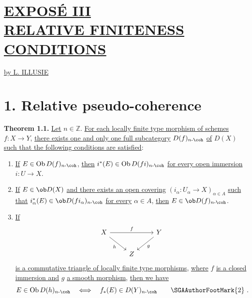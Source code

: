 \section*{\underline{EXPOSÉ III}\\[3pt] \underline{\underline{RELATIVE FINITENESS CONDITIONS}}}
\begin{center}
\underline{by L. ILLUSIE}
\end{center}

\section*{1. Relative pseudo-coherence}

\textbf{Theorem 1.1.} \uline{Let} \(n\in\mathbb Z\). \uline{For each locally finite type morphism of schemes} \(f:X\longrightarrow Y\), \uline{there exists one and only one full subcategory} \(D(f)_{n\text{-}\coh}\) \uline{of} \(D(X)\) \uline{such that the following conditions are satisfied}:
\begin{enumerate}[label=(\roman*)]
\item \uline{If} \(E\in\operatorname{Ob} D(f)_{n\text{-}\coh}\), \uline{then} \(i^*(E)\in\operatorname{Ob} D(fi)_{n\text{-}\coh}\) \uline{for every open immersion} \(i:U\to X\).

\item \uline{If} \(E\in\ob D(X)\) \uline{and there exists an open covering} \((i_\alpha:U_\alpha\to X)_{\alpha\in A}\) \uline{such that} \(i_\alpha^*(E)\in\ob D(fi_\alpha)_{n\text{-}\coh}\) \uline{for every} \(\alpha\in A\), \uline{then} \(E\in\ob D(f)_{n\text{-}\coh}\).

\item \uline{If}
\[
\begin{tikzcd}
X \arrow[rr,"f"] \arrow[dr,"h"'] & & Y \arrow[dl,"g"]\\
& Z &
\end{tikzcd}
\]
\uline{is a commutative triangle of locally finite type morphisms}, \uline{where} \(f\) \uline{is a closed immersion and} \(g\) \uline{a smooth morphism}, \uline{then we have}
\[
  E\in\operatorname{Ob} D(h)_{n\text{-}\coh}
  \quad\Longleftrightarrow\quad
  f_*(E)\in D(Y)_{n\text{-}\coh}\qquad\mbox{\SGAAuthorFootMark{2}}\ .
\]
\end{enumerate}


